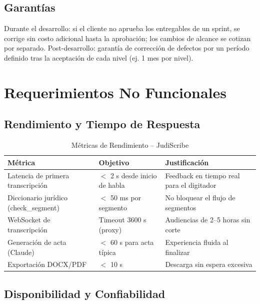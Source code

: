 \documentclass[12pt,a4paper]{report}
\begin{document}
\section{Garantías}

Durante el desarrollo: si el cliente no aprueba los entregables de un sprint, se corrige sin costo adicional hasta la aprobación; los cambios de alcance se cotizan por separado. Post-desarrollo: garantía de corrección de defectos por un período definido tras la aceptación de cada nivel (ej. 1 mes por nivel).

\chapter{Requerimientos No Funcionales}

\section{Rendimiento y Tiempo de Respuesta}

\begin{table}[H]
\centering
\small
\begin{tabular}{|p{5cm}|p{3cm}|p{5cm}|}
\hline
\rowcolor{primaryblue!20}
\textbf{Métrica} & \textbf{Objetivo} & \textbf{Justificación} \\
\hline
Latencia de primera transcripción & $<$ 2 s desde inicio de habla & Feedback en tiempo real para el digitador \\
\hline
Diccionario jurídico (check\_segment) & $<$ 50 ms por segmento & No bloquear el flujo de segmentos \\
\hline
WebSocket de transcripción & Timeout 3600 s (proxy) & Audiencias de 2--5 horas sin corte \\
\hline
Generación de acta (Claude) & $<$ 60 s para acta típica & Experiencia fluida al finalizar \\
\hline
Exportación DOCX/PDF & $<$ 10 s & Descarga sin espera excesiva \\
\hline
\end{tabular}
\caption{Métricas de Rendimiento -- JudiScribe}
\end{table}

\section{Disponibilidad y Confiabilidad}
\end{document}
